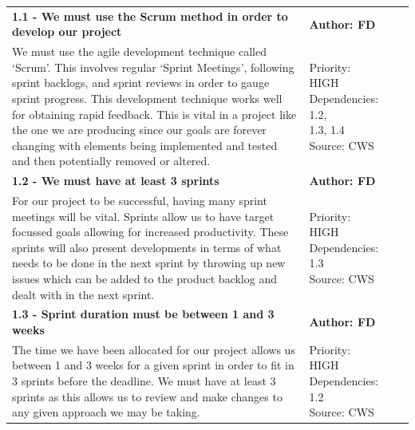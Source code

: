 \documentclass[10pt, notitlepage]{report}
\begin{document}
\begin{center}

\begin{longtable}{| p{13cm} | p{3cm} |}
\endfirsthead
\endlastfoot

\multicolumn{2}{c}{\textit{Continued from last page}}
\endhead

\multicolumn{2}{c}{\textit{Continued on next page}}
\endfoot

\hline
\multicolumn{2}{|l|}{\textbf{\textit{1 - Software Development Process}}} \\
\hline
\textbf{1.1 - We must use the Scrum method in order to develop our project} & \textbf{Author: FD} \\
\hline
We must use the agile development technique called ‘Scrum’. This involves regular ‘Sprint Meetings’, following sprint backlogs, and sprint reviews in order to gauge sprint progress. This development technique works well for obtaining rapid feedback. This is vital in a project like the one we are producing since our goals are forever changing with elements being implemented and tested and then potentially removed or altered.&
\makecell{Priority: HIGH\\Dependencies: 1.2,\\1.3, 1.4\\Source: CWS}\\
\hline
\textbf{1.2 - We must have at least 3 sprints} & \textbf{Author: FD} \\
\hline
For our project to be successful, having many sprint meetings will be vital. Sprints allow us to have target focussed goals allowing for increased productivity. These sprints will also present developments in terms of what needs to be done in the next sprint by throwing up new issues which can be added to the product backlog and dealt with in the next sprint.&
\makecell{Priority: HIGH\\Dependencies: 1.3\\Source: CWS} \\
\hline
\textbf{1.3 - Sprint duration must be between 1 and 3 weeks} & \textbf{Author: FD} \\
\hline
The time we have been allocated for our project allows us between 1 and 3 weeks for a given sprint in order to fit in 3 sprints before the deadline. We must have at least 3 sprints as this allows us to review and make changes to any given approach we may be taking.&
\makecell{Priority: HIGH\\Dependencies: 1.2\\Source: CWS} \\

\end{longtable}
\end{center}
\end{document}
